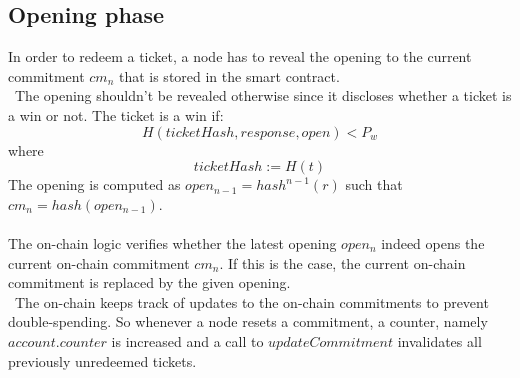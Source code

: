 \subsection{Opening phase}
In order to redeem a ticket, a node has to reveal the opening to the current commitment $cm_n$ that is stored in the smart contract. 
\\~The opening shouldn’t be revealed otherwise since it discloses whether a ticket is a win or not.
The ticket is a win if: $$H( ticketHash, response, open ) <P_w$$ where $$ticketHash:=H(t)$$
The opening is computed as $open_{n-1} = hash^{n-1}(r)$ such that $cm_n=hash( open_{n-1})$. 
\\~\\The on-chain logic verifies whether the latest opening $open_n$ indeed opens the current on-chain commitment $cm_n$. 
If this is the case, the current on-chain commitment is replaced by the given opening. 
\\~The on-chain keeps track of updates to the on-chain commitments to prevent double-spending. 
So whenever a node resets a commitment, a counter, namely $account.counter$ is increased and a call to $updateCommitment$ invalidates all previously unredeemed tickets.








